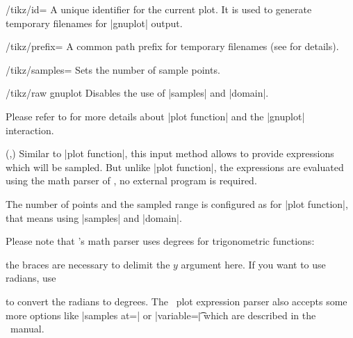 \begin{key}{/tikz/id=}
	 A unique identifier for the current plot. It is used to generate temporary filenames for |gnuplot| output.
\end{key}

\begin{key}{/tikz/prefix=}
	 A common path prefix for temporary filenames (see \cite[section~18.6]{tikz} for details).
\end{key}

\begin{key}{/tikz/samples=}
	 Sets the number of sample points.
\end{key}

\begin{key}{/tikz/raw gnuplot}
	 Disables the use of |samples| and |domain|.
\end{key}

\noindent
Please refer to \cite[section~18.6]{tikz} for more details about |plot function| and the |gnuplot| interaction.

\begin{addplotoperation}[]{(,)}{}
	Similar to |plot function|, this input method allows to provide expressions which will be sampled. But unlike |plot function|, the expressions are evaluated using the math parser of \PGF, no external program is required.
\begin{codeexample}[]
\end{codeexample}
The number of points and the sampled range is configured as for |plot function|, that means using |samples| and |domain|.

Please note that \PGF's math parser uses degrees for trigonometric functions:
\begin{codeexample}[]
\end{codeexample}
the braces are necessary to delimit the $y$ argument here. If you want to use radians, use 
\begin{codeexample}[]
\end{codeexample}
to convert the radians to degrees. The \Tikz\ plot expression parser also accepts some more options like |samples at=| or |variable=\t| which are described in the \Tikz\ manual.
\end{addplotoperation}

